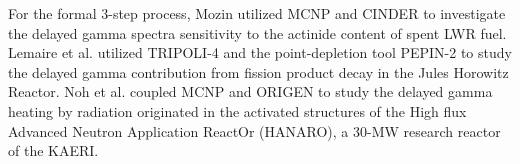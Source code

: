 For the formal 3-step process, Mozin \cite{mozin_delayed_2011} utilized MCNP \cite{mcnp} and CINDER \cite{mcnp-cinder} to investigate the delayed gamma spectra sensitivity to the actinide content of spent \gls*{LWR} fuel.
Lemaire et al. \cite{lemaire_estimation_2015} utilized TRIPOLI-4 \cite{tripoli4} and the point-depletion tool PEPIN-2 \cite{pepin2} to study the delayed gamma contribution from fission product decay in the Jules Horowitz Reactor.
Noh et al. \cite{noh_estimation_2018} coupled MCNP and ORIGEN to study the delayed gamma heating by radiation originated in the activated structures of the High flux Advanced Neutron Application ReactOr (HANARO), a 30-MW research reactor of the \gls*{KAERI}.
